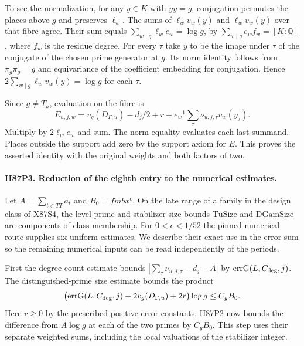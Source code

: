 To see the normalization, for any $y\in K$ with $y\bar y=g$,
conjugation permutes the places above $g$ and preserves $\ell_w$.
The sums of $\ell_w v_w(y)$ and $\ell_w v_w(\bar y)$ over that
fibre agree. Their sum equals $\sum_{w\mid g}\ell_we_w=\log g$,
by $\sum_{w\mid g}e_wf_w=[K:\mathbb Q]$, where $f_w$ is the
residue degree. For every $\tau$ take $y$ to be the image under
$\tau$ of the conjugate of the chosen prime generator at $g$.
Its norm identity follows from $\pi_g\bar\pi_g=g$ and equivariance
of the coefficient embedding for conjugation. Hence
$2\sum_{w\mid g}\ell_wv_w(y)=\log g$ for each $\tau$.

Since $g\ne T_u$, evaluation on the fibre is
\[
 E_{u,j,w}=v_g(D_{\Gamma,u})-d_j/2+r+
              e_w^{-1}\sum_\tau\nu_{u,j,\tau}v_w(y_\tau).
\]
Multiply by $2\ell_we_w$ and sum. The norm equality evaluates
each last summand. Places outside the support add zero by the
support axiom for $E$. This proves the asserted identity with
the original weights and both factors of two.

\paragraph{H87P3. Reduction of the eighth entry to the numerical estimates.}
Let $A=\sum_{t\in TT}a_t$ and $B_0=fmbx^\epsilon$.
On the late range of a family in the design class of X87S4, the
level-prime and stabilizer-size bounds $\mathrm{TuSize}$ and
$\mathrm{DGamSize}$ are components of class membership. For
$0<\epsilon<1/52$ the pinned numerical route supplies six uniform
estimates. We describe their exact use in the error sum so the
remaining numerical inputs can be read independently of the periods.

First the degree-count estimate bounds
$|\sum_\tau\nu_{u,j,\tau}-d_j-A|$ by
$\mathrm{errG}(L,C_{\rm deg},j)$. The distinguished-prime size
estimate bounds the product
\[
  \big(\mathrm{errG}(L,C_{\rm deg},j)+2v_g(D_{\Gamma,u})+2r\big)
         \log g \le C_g B_0 .
\]
Here $r\ge0$ by the prescribed positive error constants. H87P2 now
bounds the difference from $A\log g$ at each of the two primes by
$C_gB_0$. This step uses their separate weighted sums, including
the local valuations of the stabilizer integer.

